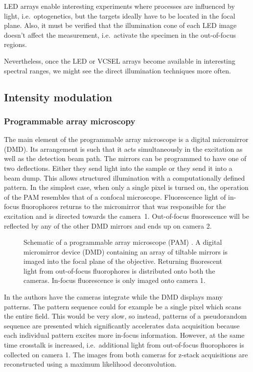 LED arrays enable interesting experiments where processes are
influenced by light, i.e.\ optogenetics, but the targets ideally have
to be located in the focal plane. Also, it must be verified that the
illumination cone of each LED image doesn't affect the measurement,
i.e.\ activate the specimen in the out-of-focus regions.

Nevertheless, once the LED or VCSEL arrays become available in
interesting spectral ranges, we might see the direct illumination
techniques more often.

\subsection{Intensity modulation}
\subsubsection{Programmable array microscopy}
\label{ref:pam}
The main element of the programmable array microscope is a digital
micromirror (DMD). Its arrangement is such that it acts simultaneously
in the excitation as well as the detection beam path. The mirrors can
be programmed to have one of two deflections. Either they send light
into the sample or they send it into a beam dump. This allows
structured illumination with a computationally defined pattern. In the
simplest case, when only a single pixel is turned on, the operation of
the PAM resembles that of a confocal microscope. Fluorescence light of
in-focus fluorophores returns to the micromirror that was responsible
for the excitation and is directed towards the camera~1. Out-of-focus
fluorescence will be reflected by any of the other DMD mirrors and
ends up on camera 2. 

\begin{figure}[htbp]
  \centering
  \caption{Schematic of a programmable array microscope (PAM)
    \citep[inspired from][]{Verveer1998}. A digital micromirror
    device (DMD) containing an array of tiltable mirrors is imaged
    into the focal plane of the objective. Returning fluorescent light
    from out-of-focus fluorophores is distributed onto both the
    cameras. In-focus fluorescence is only imaged onto camera 1.}
  \label{fig:pam-sketch}
\end{figure}


In \cite{Heintzmann2001a} the authors have the cameras integrate while
the DMD displays many patterns. The pattern sequence could for example
be a single pixel which scans the entire field. This would be very
slow, so instead, patterns of a pseudorandom sequence are presented
which significantly accelerates data acquisition because each
individual pattern excites more in-focus information. However, at the
same time crosstalk is increased, i.e.\ additional light from
out-of-focus fluorophores is collected on camera 1.  The images from
both cameras for z-stack acquisitions are reconstructed using a
maximum likelihood deconvolution.

